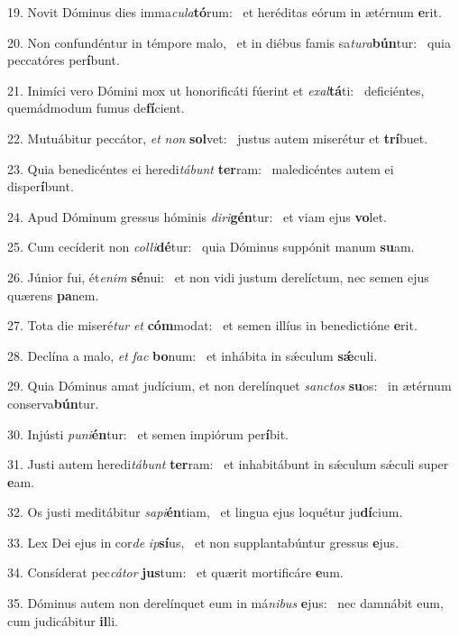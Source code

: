 19. Novit Dóminus dies imma\textit{cu}\textit{la}\textbf{tó}rum: \ast\  et heréditas eórum in ætérnum \textbf{e}rit.\

20. Non confundéntur in témpore malo, \dag\  et in diébus famis sa\textit{tu}\textit{ra}\textbf{bún}tur: \ast\  quia peccatóres per\textbf{í}bunt.\

21. Inimíci vero Dómini mox ut honorificáti fúerint et \textit{ex}\textit{al}\textbf{tá}ti: \ast\  deficiéntes, quemádmodum fumus de\textbf{fí}cient.\

22. Mutuábitur peccátor, \textit{et} \textit{non} \textbf{sol}vet: \ast\  justus autem miserétur et \textbf{trí}buet.\

23. Quia benedicéntes ei heredi\textit{tá}\textit{bunt} \textbf{ter}ram: \ast\  maledicéntes autem ei disper\textbf{í}bunt.\

24. Apud Dóminum gressus hóminis \textit{di}\textit{ri}\textbf{gén}tur: \ast\  et viam ejus \textbf{vo}let.\

25. Cum cecíderit non \textit{col}\textit{li}\textbf{dé}tur: \ast\  quia Dóminus suppónit manum \textbf{su}am.\

26. Júnior fui, ét\textit{e}\textit{nim} \textbf{sé}nui: \ast\  et non vidi justum derelíctum, nec semen ejus quærens \textbf{pa}nem.\

27. Tota die miseré\textit{tur} \textit{et} \textbf{cóm}modat: \ast\  et semen illíus in benedictióne \textbf{e}rit.\

28. Declína a malo, \textit{et} \textit{fac} \textbf{bo}num: \ast\  et inhábita in sǽculum \textbf{sǽ}culi.\

29. Quia Dóminus amat judícium, et non derelínquet \textit{sanc}\textit{tos} \textbf{su}os: \ast\  in ætérnum conserva\textbf{bún}tur.\

30. Injústi \textit{pu}\textit{ni}\textbf{én}tur: \ast\  et semen impiórum per\textbf{í}bit.\

31. Justi autem heredi\textit{tá}\textit{bunt} \textbf{ter}ram: \ast\  et inhabitábunt in sǽculum sǽculi super \textbf{e}am.\

32. Os justi meditábitur \textit{sa}\textit{pi}\textbf{én}tiam, \ast\  et lingua ejus loquétur ju\textbf{dí}cium.\

33. Lex Dei ejus in cor\textit{de} \textit{ip}\textbf{sí}us, \ast\  et non supplantabúntur gressus \textbf{e}jus.\

34. Consíderat pec\textit{cá}\textit{tor} \textbf{jus}tum: \ast\  et quærit mortificáre \textbf{e}um.\

35. Dóminus autem non derelínquet eum in má\textit{ni}\textit{bus} \textbf{e}jus: \ast\  nec damnábit eum, cum judicábitur \textbf{il}li.\

